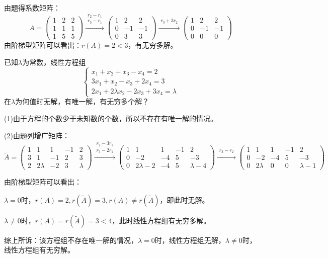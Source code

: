 \documentclass[a4paper]{report}
\begin{document}
\begin{jie}
由题得系数矩阵：
\begin{equation*}
A=
\begin{pmatrix}
1&2&2\\
1&1&1\\
1&5&5
\end{pmatrix}
\xrightarrow{\substack{r_2-r_1\\ r_3-r_1}}{
\begin{pmatrix}
1&2&2\\
0&-1&-1\\
0&3&3
\end{pmatrix}
}\xrightarrow{\substack{r_3+3r_2}}{
\begin{pmatrix}
1&2&2\\
0&-1&-1\\
0&0&0
\end{pmatrix}
}
\end{equation*}
由阶梯型矩阵可以看出：$r(A)=2<3$，有无穷多解。
\end{jie}

\EX 已知$\lambda$为常数，线性方程组
\begin{equation*}
\begin{cases}
x_1+x_2+x_3-x_4=2\\
3x_1+x_2-x_3+2x_4=3\\
2x_1+2\lambda x_2-2x_3+3x_4=\lambda
\end{cases}
\end{equation*}
在$\lambda$为何值时无解，有唯一解，有无穷多个解？

\begin{jie}
(1)由于方程的个数少于未知数的个数，所以不存在有唯一解的情况。

(2)由题列增广矩阵：
\begin{equation*}
\widetilde{A}=
\begin{pmatrix}
1&1&1&-1&2\\
3&1&-1&2&3\\
2&2\lambda&-2&3&\lambda
\end{pmatrix}
\xrightarrow{\substack{r_2-3r_1\\ r_3-2r_1}}{
\begin{pmatrix}
1&1&1&-1&2\\
0&-2&-4&5&-3\\
0&2\lambda-2&-4&5&\lambda-4
\end{pmatrix}
}\xrightarrow{\substack{r_3-r_2}}{
\begin{pmatrix}
1&1&1&-1&2\\
0&-2&-4&5&-3\\
0&2\lambda&0&0&\lambda-1
\end{pmatrix}
}
\end{equation*}

由阶梯型矩阵可以看出：

$\lambda = 0$时，$r(A)=2,r(\widetilde{A})=3,r(A)\neq r(\widetilde{A})$，即此时无解。

$\lambda\neq 0$时，$r(A)=r(\widetilde{A})=3<4$，此时线性方程组有无穷多解。

综上所诉：该方程组不存在唯一解的情况，$\lambda=0$时，线性方程组无解，$\lambda\neq 0$时，线性方程组有无穷解。
\end{jie}
\end{document}
